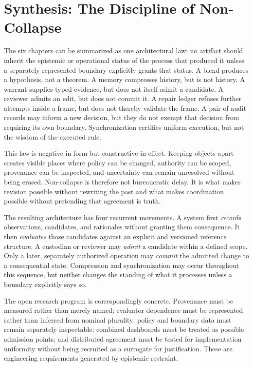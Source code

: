 \documentclass[11pt,openany]{book}
\begin{document}
\backmatter
\chapter{Synthesis: The Discipline of Non-Collapse}
The six chapters can be summarized as one architectural law: no artifact should inherit the epistemic or operational status of the process that produced it unless a separately represented boundary explicitly grants that status. A blend produces a hypothesis, not a theorem. A memory compresses history, but is not history. A warrant supplies typed evidence, but does not itself admit a candidate. A reviewer admits an edit, but does not commit it. A repair ledger refuses further attempts inside a frame, but does not thereby validate the frame. A pair of audit records may inform a new decision, but they do not exempt that decision from requiring its own boundary. Synchronization certifies uniform execution, but not the wisdom of the executed rule.

This law is negative in form but constructive in effect. Keeping objects apart creates visible places where policy can be changed, authority can be scoped, provenance can be inspected, and uncertainty can remain unresolved without being erased. Non-collapse is therefore not bureaucratic delay. It is what makes revision possible without rewriting the past and what makes coordination possible without pretending that agreement is truth.

The resulting architecture has four recurrent movements. A system first \emph{records} observations, candidates, and rationales without granting them consequence. It then \emph{evaluates} those candidates against an explicit and versioned reference structure. A custodian or reviewer may \emph{admit} a candidate within a defined scope. Only a later, separately authorized operation may \emph{commit} the admitted change to a consequential state. Compression and synchronization may occur throughout this sequence, but neither changes the standing of what it processes unless a boundary explicitly says so.

The open research program is correspondingly concrete. Provenance must be measured rather than merely named; evaluator dependence must be represented rather than inferred from nominal plurality; policy and boundary data must remain separately inspectable; combined dashboards must be treated as possible admission points; and distributed agreement must be tested for implementation uniformity without being recruited as a surrogate for justification. These are engineering requirements generated by epistemic restraint.
\end{document}
